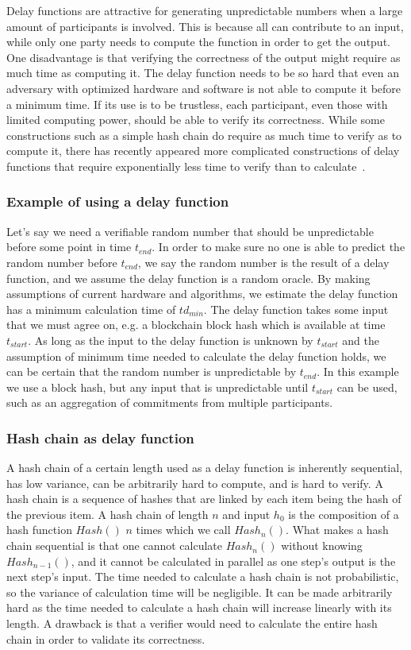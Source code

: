 Delay functions are attractive for generating unpredictable numbers when a large amount of participants is involved. This is because all can contribute to an input, while only one party needs to compute the function in order to get the output. One disadvantage is that verifying the correctness of the output might require as much time as computing it. The delay function needs to be so hard that even an adversary with optimized hardware and software is not able to compute it before a minimum time. If its use is to be trustless, each participant, even those with limited computing power, should be able to verify its correctness. While some constructions such as a simple hash chain do require as much time to verify as to compute it, there has recently appeared more complicated constructions of delay functions that require exponentially less time to verify than to calculate~\cite{boneh_verifiable_2018}.

\subsubsection{Example of using a delay function}
Let's say we need a verifiable random number that should be unpredictable before some point in time $t_{end}$. In order to make sure no one is able to predict the random number before $t_{end}$, we say the random number is the result of a delay function, and we assume the delay function is a random oracle. By making assumptions of current hardware and algorithms, we estimate the delay function has a minimum calculation time of $td_{min}$. The delay function takes some input that we must agree on, e.g. a blockchain block hash which is available at time $t_{start}$. As long as the input to the delay function is unknown by $t_{start}$ and the assumption of minimum time needed to calculate the delay function holds, we can be certain that the random number is unpredictable by $t_{end}$. In this example we use a block hash, but any input that is unpredictable until $t_{start}$ can be used, such as an aggregation of commitments from multiple participants.

\subsubsection{Hash chain as delay function}
A hash chain of a certain length used as a delay function is inherently sequential, has low variance, can be arbitrarily hard to compute, and is hard to verify. A hash chain is a sequence of hashes that are linked by each item being the hash of the previous item. A hash chain of length $n$ and input $h_0$ is the composition of a hash function $Hash()$ $n$ times which we call $Hash_n()$. What makes a hash chain sequential is that one cannot calculate $Hash_n()$ without knowing $Hash_{n-1}()$, and it cannot be calculated in parallel as one step's output is the next step's input. The time needed to calculate a hash chain is not probabilistic, so the variance of calculation time will be negligible. It can be made arbitrarily hard as the time needed to calculate a hash chain will increase linearly with its length. A drawback is that a verifier would need to calculate the entire hash chain in order to validate its correctness. 

